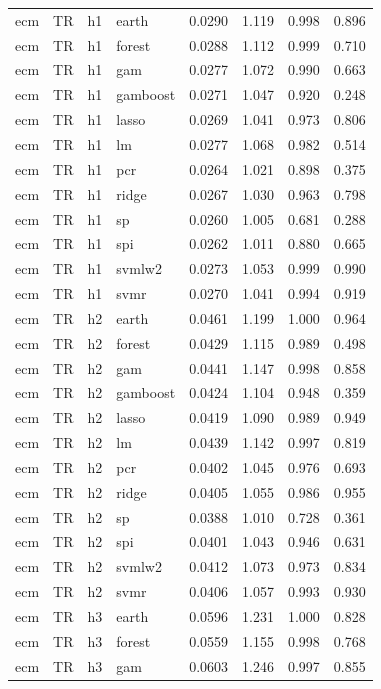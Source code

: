 \begin{ThreePartTable}
\begin{longtable}[t]{llclcccc}
\addlinespace
ecm & TR & h1 & earth & 0.0290 & 1.119 & 0.998 & 0.896\\
ecm & TR & h1 & forest & 0.0288 & 1.112 & 0.999 & 0.710\\
ecm & TR & h1 & gam & 0.0277 & 1.072 & 0.990 & 0.663\\
ecm & TR & h1 & gamboost & 0.0271 & 1.047 & 0.920 & 0.248\\
ecm & TR & h1 & lasso & 0.0269 & 1.041 & 0.973 & 0.806\\
ecm & TR & h1 & lm & 0.0277 & 1.068 & 0.982 & 0.514\\
ecm & TR & h1 & pcr & 0.0264 & 1.021 & 0.898 & 0.375\\
ecm & TR & h1 & ridge & 0.0267 & 1.030 & 0.963 & 0.798\\
ecm & TR & h1 & sp & 0.0260 & 1.005 & 0.681 & 0.288\\
ecm & TR & h1 & spi & 0.0262 & 1.011 & 0.880 & 0.665\\
ecm & TR & h1 & svmlw2 & 0.0273 & 1.053 & 0.999 & 0.990\\
ecm & TR & h1 & svmr & 0.0270 & 1.041 & 0.994 & 0.919\\
\addlinespace
ecm & TR & h2 & earth & 0.0461 & 1.199 & 1.000 & 0.964\\
ecm & TR & h2 & forest & 0.0429 & 1.115 & 0.989 & 0.498\\
ecm & TR & h2 & gam & 0.0441 & 1.147 & 0.998 & 0.858\\
ecm & TR & h2 & gamboost & 0.0424 & 1.104 & 0.948 & 0.359\\
ecm & TR & h2 & lasso & 0.0419 & 1.090 & 0.989 & 0.949\\
ecm & TR & h2 & lm & 0.0439 & 1.142 & 0.997 & 0.819\\
ecm & TR & h2 & pcr & 0.0402 & 1.045 & 0.976 & 0.693\\
ecm & TR & h2 & ridge & 0.0405 & 1.055 & 0.986 & 0.955\\
ecm & TR & h2 & sp & 0.0388 & 1.010 & 0.728 & 0.361\\
ecm & TR & h2 & spi & 0.0401 & 1.043 & 0.946 & 0.631\\
ecm & TR & h2 & svmlw2 & 0.0412 & 1.073 & 0.973 & 0.834\\
ecm & TR & h2 & svmr & 0.0406 & 1.057 & 0.993 & 0.930\\
\addlinespace
ecm & TR & h3 & earth & 0.0596 & 1.231 & 1.000 & 0.828\\
ecm & TR & h3 & forest & 0.0559 & 1.155 & 0.998 & 0.768\\
ecm & TR & h3 & gam & 0.0603 & 1.246 & 0.997 & 0.855\\

\end{longtable}
\end{ThreePartTable}
